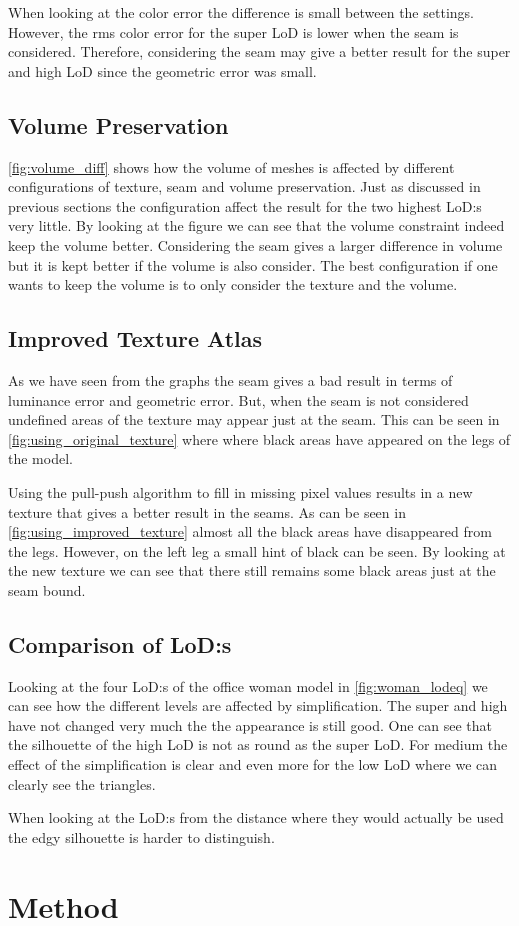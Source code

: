 When looking at the color error the difference is small between the settings. However, the rms color error for the super LoD is lower when the seam is considered. Therefore, considering the seam may give a better result for the super and high LoD since the geometric error was small.



\subsection{Volume Preservation} \label{sec:discussion_volume}
\cref{fig:volume_diff} shows how the volume of meshes is affected by different configurations of texture, seam and volume preservation. Just as discussed in previous sections the configuration affect the result for the two highest LoD:s very little. By looking at the figure we can see that the volume constraint indeed keep the volume better. Considering the seam gives a larger difference in volume but it is kept better if the volume is also consider. The best configuration if one wants to keep the volume is to only consider the texture and the volume.


\subsection{Improved Texture Atlas} \label{sec:discussion_texture}
As we have seen from the graphs the seam gives a bad result in terms of luminance error and geometric error. But, when the seam is not considered undefined areas of the texture may appear just at the seam. This can be seen in \cref{fig:using_original_texture} where where black areas have appeared on the legs of the model.

Using the pull-push algorithm to fill in missing pixel values results in a new texture that gives a better result in the seams. As can be seen in \cref{fig:using_improved_texture} almost all the black areas have disappeared from the legs. However, on the left leg a small hint of black can be seen. By looking at the new texture we can see that there still remains some black areas just at the seam bound.

\subsection{Comparison of LoD:s} \label{sec:discussion_lod}
Looking at the four LoD:s of the office woman model in \cref{fig:woman_lodeq} we can see how the different levels are affected by simplification. The super and high have not changed very much the the appearance is still good. One can see that the silhouette of the high LoD is not as round as the super LoD. For medium the effect of the simplification is clear and even more for the low LoD where we can clearly see the triangles.

When looking at the LoD:s from the distance where they would actually be used the edgy silhouette is harder to distinguish. 

\section{Method} \label{sec:discussion_method}

  
